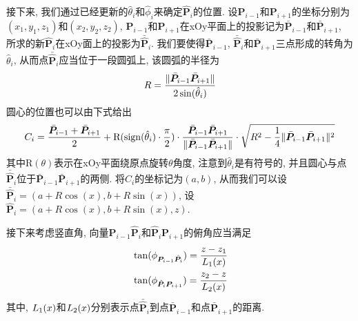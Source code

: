 \documentclass[utf8]{ctexart} %
\begin{document}
	 接下来, 我们通过已经更新的$\hat{\theta}_i$和$\hat{\phi}_i$来确定$\hat{\boldsymbol{P}}_i$的位置. 设$\boldsymbol{P}_{i-1}$和$\boldsymbol{P}_{i+1}$的坐标分别为$(x_1,y_1,z_1)$和$(x_2,y_2,z_2)$, $\boldsymbol{P}_{i-1}$和$\boldsymbol{P}_{i+1}$在xOy平面上的投影记为$\bar{\boldsymbol{P}}_{i-1}$和$\bar{\boldsymbol{P}}_{i+1}$, 所求的新$\hat{\boldsymbol{P}}_i$在xOy面上的投影为$\bar{\hat{\boldsymbol{P}}}_i$. 我们要使得$\bar{\boldsymbol{P}}_{i-1}$, $\bar{\hat{\boldsymbol{P}}}_i$和$\bar{\boldsymbol{P}}_{i+1}$三点形成的转角为$\hat{\theta}_i$, 从而点$\bar{\hat{\boldsymbol{P}}}_i$应当位于一段圆弧上, 该圆弧的半径为
	 \begin{equation}\label{R}
	 R = \frac{\Arrowvert\bar{\boldsymbol{P}}_{i-1}\bar{\boldsymbol{P}}_{i+1}\Arrowvert}{2\sin(\hat{\theta}_i)}
	 \end{equation}
	 圆心的位置也可以由下式给出
	 \begin{equation}\label{center}
	 C_i = \frac{\bar{\boldsymbol{P}}_{i-1}+\bar{\boldsymbol{P}}_{i+1}}2+\mathrm{R}(\mathrm{sign}(\hat{\theta}_i)\cdot\frac{\pi}2)\cdot\frac{\bar{\boldsymbol{P}}_{i-1}\bar{\boldsymbol{P}}_{i+1}}{\Arrowvert\bar{\boldsymbol{P}}_{i-1}\bar{\boldsymbol{P}}_{i+1}\Arrowvert}\cdot\sqrt{R^2-\frac14\Arrowvert\bar{\boldsymbol{P}}_{i-1}\bar{\boldsymbol{P}}_{i+1}\Arrowvert^2}
	 \end{equation}
	 其中$\mathrm{R}(\theta)$表示在xOy平面绕原点旋转$\theta$角度, 注意到$\hat{\theta}_i$是有符号的, 并且圆心与点$\bar{\hat{\boldsymbol{P}}}_i$位于$\bar{\boldsymbol{P}}_{i-1}\bar{\boldsymbol{P}}_{i+1}$的两侧. 将$C_i$的坐标记为$(a,b)$, 从而我们可以设$\bar{\hat{\boldsymbol{P}}}_i=(a+R\cos(x),b+R\sin(x))$, 设$\hat{\boldsymbol{P}}_i=(a+R\cos(x),b+R\sin(x),z)$. \par 
	 接下来考虑竖直角, 向量$\boldsymbol{P}_{i-1}\hat{\boldsymbol{P}}_i$和$\hat{\boldsymbol{P}}_i\boldsymbol{P}_{i+1}$的俯角应当满足
	 \begin{equation}
	 \begin{aligned}
	 &\tan(\phi_{\boldsymbol{P}_{i-1}\hat{\boldsymbol{P}}_i}) = \frac{z-z_1}{\boldmath{L}_1(x)}\\
	 &\tan(\phi_{\hat{\boldsymbol{P}}_i\boldsymbol{P}_{i+1}}) = \frac{z_2-z}{\boldmath{L}_2(x)}
	 \end{aligned}
	 \end{equation}
	 其中, $\boldmath{L}_1(x)$和$\boldmath{L}_2(x)$分别表示点$\bar{\hat{\boldsymbol{P}}}_i$到点$\bar{\boldsymbol{P}}_{i-1}$和点$\bar{\boldsymbol{P}}_{i+1}$的距离.
	 
\end{document}
